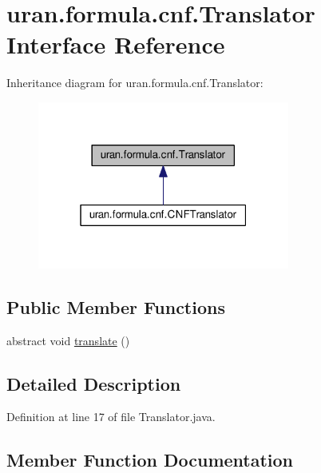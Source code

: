\hypertarget{interfaceuran_1_1formula_1_1cnf_1_1_translator}{}\section{uran.\+formula.\+cnf.\+Translator Interface Reference}
\label{interfaceuran_1_1formula_1_1cnf_1_1_translator}


Inheritance diagram for uran.\+formula.\+cnf.\+Translator\+:
\nopagebreak
\begin{figure}[H]
\begin{center}
\leavevmode
\includegraphics[width=235pt]{interfaceuran_1_1formula_1_1cnf_1_1_translator__inherit__graph}
\end{center}
\end{figure}
\subsection*{Public Member Functions}
\begin{DoxyCompactItemize}
\item 
abstract void \hyperlink{interfaceuran_1_1formula_1_1cnf_1_1_translator_a55ca28e7487e311573b3593ced70d634}{translate} ()
\end{DoxyCompactItemize}


\subsection{Detailed Description}


Definition at line 17 of file Translator.\+java.



\subsection{Member Function Documentation}
\hypertarget{interfaceuran_1_1formula_1_1cnf_1_1_translator_a55ca28e7487e311573b3593ced70d634}{}
